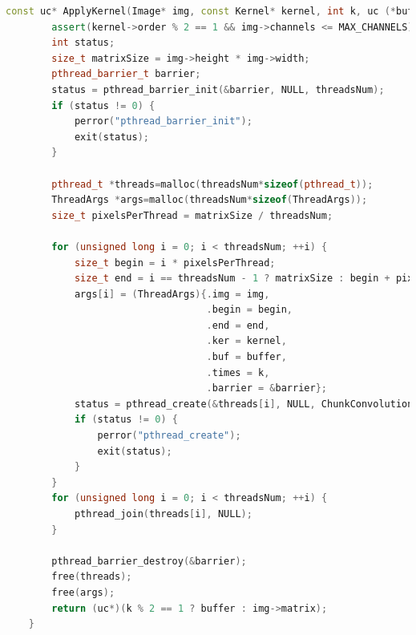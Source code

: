\documentclass[a4paper, 12pt]{article}
\begin{document}
\begin{lstlisting}[language=C++]
    const uc* ApplyKernel(Image* img, const Kernel* kernel, int k, uc (*buffer)[], unsigned long threadsNum) {
        assert(kernel->order % 2 == 1 && img->channels <= MAX_CHANNELS);
        int status;
        size_t matrixSize = img->height * img->width;
        pthread_barrier_t barrier;
        status = pthread_barrier_init(&barrier, NULL, threadsNum);
        if (status != 0) {
            perror("pthread_barrier_init");
            exit(status);
        }
    
        pthread_t *threads=malloc(threadsNum*sizeof(pthread_t));
        ThreadArgs *args=malloc(threadsNum*sizeof(ThreadArgs));
        size_t pixelsPerThread = matrixSize / threadsNum;
    
        for (unsigned long i = 0; i < threadsNum; ++i) {
            size_t begin = i * pixelsPerThread;
            size_t end = i == threadsNum - 1 ? matrixSize : begin + pixelsPerThread;
            args[i] = (ThreadArgs){.img = img,
                                   .begin = begin,
                                   .end = end,
                                   .ker = kernel,
                                   .buf = buffer,
                                   .times = k,
                                   .barrier = &barrier};
            status = pthread_create(&threads[i], NULL, ChunkConvolution, &args[i]);
            if (status != 0) {
                perror("pthread_create");
                exit(status);
            }
        }
        for (unsigned long i = 0; i < threadsNum; ++i) {
            pthread_join(threads[i], NULL);
        }
    
        pthread_barrier_destroy(&barrier);
        free(threads);
        free(args);
        return (uc*)(k % 2 == 1 ? buffer : img->matrix);
    }
\end{lstlisting}
\end{document}
